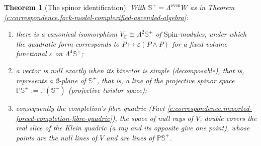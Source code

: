 \documentclass[11pt]{article}
\newtheorem{theorem}{Theorem}[section]
\theoremstyle{definition}
\theoremstyle{plain}
\newcommand{\changedmark}[2]{\marginpar{\raggedright\scriptsize\color{#1}#2}}
\providecommand{\C}{}\renewcommand{\C}{\mathbb{C}}
\providecommand{\CS}{}\renewcommand{\CS}{{\mathbb{S}^{+}}}
\providecommand{\PCS}{}\renewcommand{\PCS}{\mathbb{P}{\mathbb{S}^{+}}}
\begin{document}
\begin{theorem}[The spinor identification]\label{c:correspondence.spinor-identification}
\changedmark{gray}{reworded}
With $\CS = \Lambda^{\mathrm{even}} W$ as in Theorem \ref{c:correspondence.fock-model-complexified-ascended-algebra}:
\begin{enumerate}
\item there is a canonical isomorphism $V_\C \cong \Lambda^2 \CS$ of $\mathrm{Spin}$-modules, under which the quadratic form corresponds to $P \mapsto \varepsilon(P \wedge P)$ for a fixed volume functional $\varepsilon$ on $\Lambda^4\CS$;
\item a vector is null exactly when its bivector is simple (decomposable), that is, represents a 2-plane of $\CS$, that is, a line of the projective spinor space $\PCS := \mathbb{P}(\CS)$ (projective twistor space);
\item consequently the completion's fibre quadric (Fact \ref{c:correspondence.imported-forced-completion-fibre-quadric}), the space of null rays of $V$, double covers the real slice of the Klein quadric (a ray and its opposite give one point), whose points are the null lines of $V$ and are lines of $\PCS$.
\end{enumerate}
\end{theorem}
\end{document}
